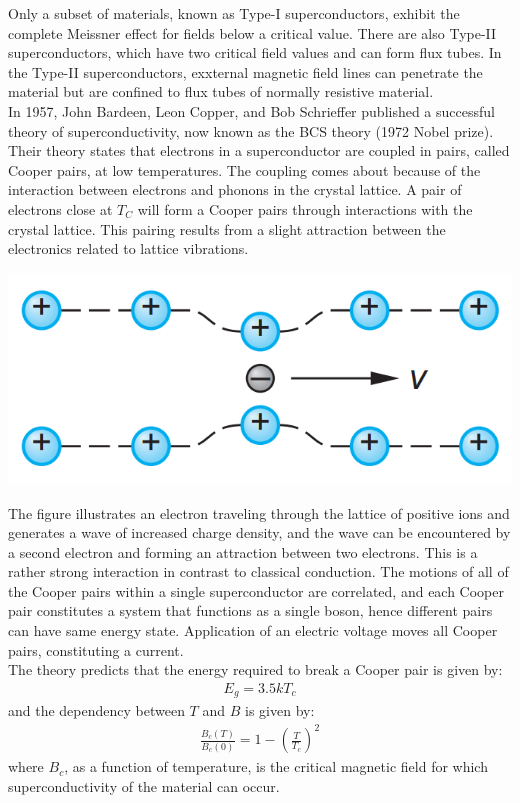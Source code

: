 \documentclass[11pt]{article}
\theoremstyle{break}
\theoremstyle{break}
\begin{document}
Only a subset of materials, known as Type-I superconductors, exhibit the complete Meissner effect for fields below a critical value. There are also Type-II superconductors, which have two critical field values and can form flux tubes. In the Type-II superconductors, exxternal magnetic field lines can penetrate the material but are confined to flux tubes of normally resistive material. \\

In 1957, John Bardeen, Leon Copper, and Bob Schrieffer published a successful theory of superconductivity, now known as the BCS theory (1972 Nobel prize). Their theory states that electrons in a superconductor are coupled in pairs, called Cooper pairs, at low temperatures. The coupling comes about because of the interaction between electrons and phonons in the crystal lattice. A pair of electrons close at $T_C$ will form a Cooper pairs through interactions with the crystal lattice. This pairing results from a slight attraction between the electronics related to lattice vibrations. \begin{center}
\includegraphics[scale=0.35]{BCSTheory}
\end{center}
The figure illustrates an electron traveling through the lattice of positive ions and generates a wave of increased charge density, and the wave can be encountered by a second electron and forming an attraction between two electrons. This is a rather strong interaction in contrast to classical conduction. The motions of all of the Cooper pairs within a single superconductor are correlated, and each Cooper pair constitutes a system that functions as a single boson, hence different pairs can have same energy state. Application of an electric voltage moves all Cooper pairs, constituting a current.\\

The theory predicts that the energy required to break a Cooper pair is given by:
\begin{align*}
E_g = 3.5k T_c
\end{align*}
and the dependency between $T$ and $B$ is given by:
\begin{align*}
\frac{B_c(T)}{B_c(0)} = 1-\left( \frac{T}{T_c}\right)^2
\end{align*}
where $B_c$, as a function of temperature, is the critical magnetic field for which superconductivity of the material can occur. \\
\end{document}
